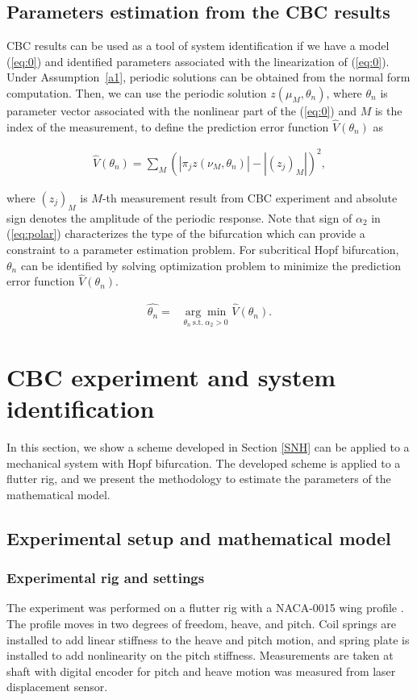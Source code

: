 \documentclass[openacc]{rsproca_new}%
\newcommand{\Eref}[1]{(\ref{#1})}
\newcommand{\asref}[1]{Assumption~\ref{#1}}
\begin{document}
\subsection{Parameters estimation from the CBC results}\label{NSI}
CBC results can be used as a tool of system identification if we have a model \Eref{eq:0} and identified parameters associated with the linearization of \Eref{eq:0}. Under \asref{a1}, periodic solutions can be obtained from the normal form computation. Then, we can use the periodic solution $z(\mu_M,\theta_n)$, where $\theta_n$ is parameter vector associated with the nonlinear part of the \Eref{eq:0} and $M$ is the index of the measurement, to define the prediction error function $\hat{V}(\theta_n)$ as

\begin{align}\label{NSI-2}
\hat{V}(\theta_n)= \sum_M (|\pi_j z(\nu_M,\theta_n)|-|(z_j)_M|)^2,
\end{align}

\noindent where $(z_j)_M$ is $M$-th measurement result from CBC experiment and absolute sign denotes the amplitude of the periodic response. Note that sign of $\alpha_2$ in \Eref{eq:polar} characterizes the type of the bifurcation which can provide a constraint to a parameter estimation problem. For subcritical Hopf bifurcation, $\theta_n$ can be identified by solving optimization problem to minimize the prediction error function $\hat{V}(\theta_n)$.

\begin{align}\label{NSI-3}
\hat{\theta_n}=&\underset{\theta_n \: \textrm{s.t.} \: \alpha_2>0} {\arg\min} \: \hat V(\theta_n).
\end{align}

\section{CBC experiment and system identification}
In this section, we show a scheme developed in Section \ref{SNH} can be applied to a mechanical system with Hopf bifurcation. The developed scheme is applied to a flutter rig, and we present the methodology to estimate the parameters of the mathematical model.

\subsection{Experimental setup and mathematical model}\label{model}
\subsubsection{Experimental rig and settings}\label{setup}
The experiment was performed on a flutter rig with a NACA-0015 wing profile \cite{jacobs1933characteristics}. The profile moves in two degrees of freedom, heave, and pitch. Coil springs are installed to add linear stiffness to the heave and pitch motion, and spring plate is installed to add nonlinearity on the pitch stiffness. Measurements are taken at shaft with digital encoder for pitch and heave motion was measured from laser displacement sensor.
\end{document}
